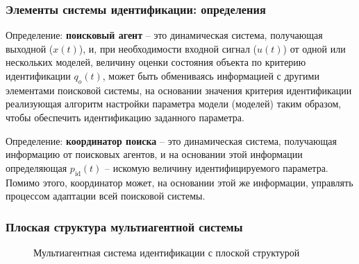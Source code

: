 \documentclass[10pt,utf8]{beamer}
\begin{document}


\begin{frame}
  \frametitle{Элементы системы идентификации: определения}

  Определение: \textbf{поисковый агент} -- это динамическая система, получающая выходной ($x(t)$),
  и, при необходимости входной сигнал ($u(t)$) от одной или нескольких моделей,
  величину оценки состояния объекта по критерию идентификации $q_o(t)$,
  может быть обмениваясь информацией с другими элементами поисковой системы,
  на основании значения критерия идентификации
  реализующая алгоритм настройки параметра модели (моделей)
  таким образом, чтобы обеспечить идентификацию заданного параметра.

  Определение: \textbf{координатор поиска} -- это динамическая система, получающая информацию
  от поисковых агентов, и на основании этой информации определяющая
  $p_{\mathrm{id}}(t)$ -- искомую величину идентифицируемого параметра.
  Помимо этого, координатор может, на основании этой же информации,
  управлять процессом адаптации всей поисковой системы.

\end{frame}




\begin{frame}[fragile]
  \frametitle{Плоская структура мультиагентной системы}

  \begin{figure}[ht!]
  \begin{center}
  
  \end{center}
  \caption{Мультиагентная система идентификации с плоской структурой}
  \label{atu:f:agents_flat}
  \end{figure}

\end{frame}



\end{document}
